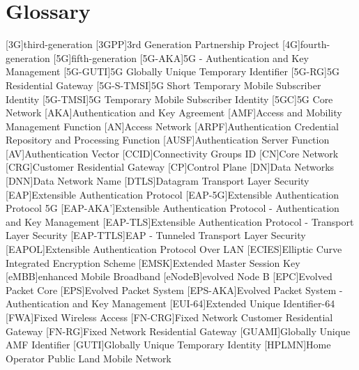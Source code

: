 \chapter{Glossary}

\footnotesize
\SingleSpacing

\begin{multicols}{2}
\begin{acronym}[AAAAAA]
[3G]{third-generation}
[3GPP]{3rd Generation Partnership Project}
[4G]{fourth-generation}
[5G]{fifth-generation}
[5G-AKA]{5G - Authentication and Key Management}
[5G-GUTI]{5G Globally Unique Temporary Identifier}
[5G-RG]{5G Residential Gateway}
[5G-S-TMSI]{5G Short Temporary Mobile Subscriber Identity}
[5G-TMSI]{5G Temporary Mobile Subscriber Identity}
[5GC]{5G Core Network}
[AKA]{Authentication and Key Agreement}
[AMF]{Access and Mobility Management Function}
[AN]{Access Network}
[ARPF]{Authentication Credential Repository and Processing Function}
[AUSF]{Authentication Server Function}
[AV]{Authentication Vector}
[CCID]{Connectivity Groups ID}
[CN]{Core Network}
[CRG]{Customer Residential Gateway}
[CP]{Control Plane}
[DN]{Data Networks}
[DNN]{Data Network Name}
[DTLS]{Datagram Transport Layer Security}
[EAP]{Extensible Authentication Protocol}
[EAP-5G]{Extensible Authentication Protocol 5G}
[EAP-AKA']{Extensible Authentication Protocol - Authentication and Key Management}
[EAP-TLS]{Extensible Authentication Protocol - Transport Layer Security}
[EAP-TTLS]{EAP - Tunneled Transport Layer Security}
[EAPOL]{Extensible Authentication Protocol Over LAN}
[ECIES]{Elliptic Curve Integrated Encryption Scheme}
[EMSK]{Extended Master Session Key}
[eMBB]{enhanced Mobile Broadband}
[eNodeB]{evolved Node B}
[EPC]{Evolved Packet Core}
[EPS]{Evolved Packet System}
[EPS-AKA]{Evolved Packet System - Authentication and Key Management}
[EUI-64]{Extended Unique Identifier-64}
[FWA]{Fixed Wireless Access}
[FN-CRG]{Fixed Network Customer Residential Gateway}
[FN-RG]{Fixed Network Residential Gateway}
[GUAMI]{Globally Unique AMF Identifier}
[GUTI]{Globally Unique Temporary Identity}
[HPLMN]{Home Operator Public Land Mobile Network}

\end{acronym}
\end{multicols}
